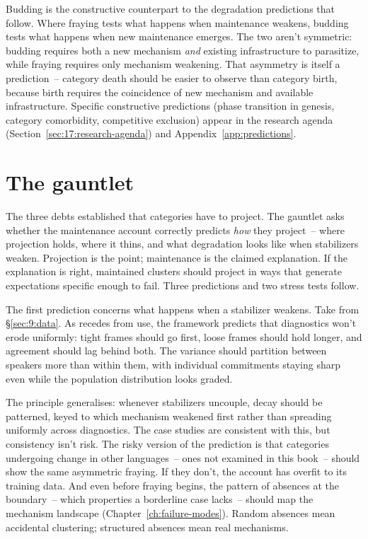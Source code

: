 Budding is the constructive counterpart to the degradation predictions that follow. Where fraying tests what happens when maintenance weakens, budding tests what happens when new maintenance emerges. The two aren't symmetric: budding requires both a new mechanism \emph{and} existing infrastructure to parasitize, while fraying requires only mechanism weakening. That asymmetry is itself a prediction~-- category death should be easier to observe than category birth, because birth requires the coincidence of new mechanism and available infrastructure. Specific constructive predictions (phase transition in genesis, category comorbidity, competitive exclusion) appear in the research agenda (Section~\ref{sec:17:research-agenda}) and Appendix~\ref{app:predictions}.

\section{The gauntlet}
\label{sec:17:prediction-fraying}

The three debts established that categories have to project. The gauntlet asks whether the maintenance account correctly predicts \emph{how} they project~-- where projection holds, where it thins, and what degradation looks like when stabilizers weaken. Projection is the point; maintenance is the claimed explanation. If the explanation is right, maintained clusters should project in ways that generate expectations specific enough to fail. Three predictions and two stress tests follow.

The first prediction concerns what happens when a stabilizer weakens. Take  from §\ref{sec:9:data}. As  recedes from use, the framework predicts that diagnostics won't erode uniformly: tight frames should go first, loose frames should hold longer, and agreement should lag behind both. The variance should partition between speakers more than within them, with individual commitments staying sharp even while the population distribution looks graded.

The principle generalises: whenever stabilizers uncouple, decay should be patterned, keyed to which mechanism weakened first rather than spreading uniformly across diagnostics. The case studies are consistent with this, but consistency isn't risk. The risky version of the prediction is that categories undergoing change in other languages~-- ones not examined in this book~-- should show the same asymmetric fraying. If they don't, the account has overfit to its training data. And even before fraying begins, the pattern of absences at the boundary~-- which properties a borderline case lacks~-- should map the mechanism landscape (Chapter~\ref{ch:failure-modes}). Random absences mean accidental clustering; structured absences mean real mechanisms.

